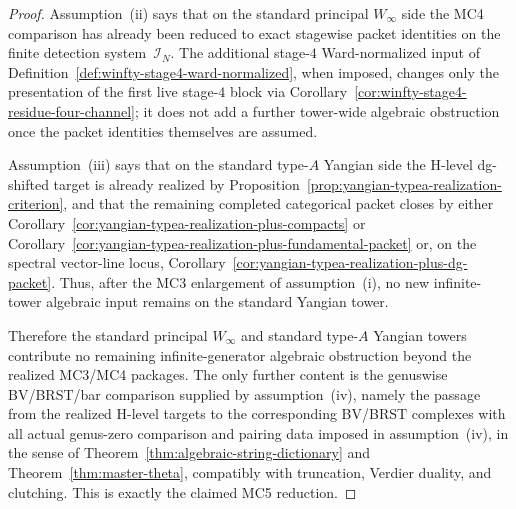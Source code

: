 \begin{proof}
Assumption~\textup{(ii)} says that on the standard principal
\texorpdfstring{$W_\infty$}{W_infty} side the MC4 comparison has
already been reduced to exact stagewise packet identities on the finite
detection system~$\mathcal{I}_N$.  The additional
stage-$4$ Ward-normalized input of
Definition~\ref{def:winfty-stage4-ward-normalized}, when imposed,
changes only the presentation of the first live stage-$4$ block via
Corollary~\ref{cor:winfty-stage4-residue-four-channel}; it does not add
a further tower-wide algebraic obstruction once the packet identities
themselves are assumed.

Assumption~\textup{(iii)} says that on the standard type-$A$ Yangian
side the H-level dg-shifted target is already realized by
Proposition~\ref{prop:yangian-typea-realization-criterion}, and that
the remaining completed categorical packet closes by either
Corollary~\ref{cor:yangian-typea-realization-plus-compacts} or
Corollary~\ref{cor:yangian-typea-realization-plus-fundamental-packet}
or, on the spectral vector-line locus,
Corollary~\ref{cor:yangian-typea-realization-plus-dg-packet}.
Thus, after the MC3 enlargement of assumption~\textup{(i)}, no new
infinite-tower algebraic input remains on the standard Yangian tower.

Therefore the standard principal \texorpdfstring{$W_\infty$}{W_infty}
and standard type-$A$ Yangian towers contribute no remaining
infinite-generator algebraic obstruction beyond the realized MC3/MC4
packages.  The only further content is the genuswise BV/BRST/bar
comparison supplied by assumption~\textup{(iv)}, namely the passage
from the realized H-level targets to the corresponding BV/BRST
complexes with all actual genus-zero comparison and pairing data imposed in assumption~\textup{(iv)}, in the sense of Theorem~\ref{thm:algebraic-string-dictionary} and
Theorem~\ref{thm:master-theta}, compatibly with truncation, Verdier
duality, and clutching.  This is exactly the claimed MC5 reduction.
\end{proof}

